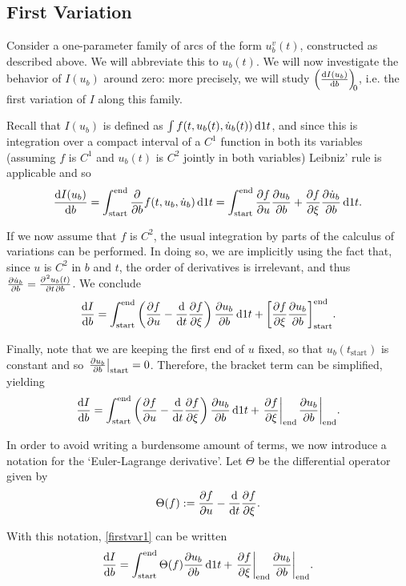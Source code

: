 \documentclass{article}
\theoremstyle{plain}
\theoremstyle{plain}
\theoremstyle{nonumberplain}
\theoremstyle{empty}
\newcommand{\tstart}{\mathrm{start}}
\newcommand{\tend}{\mathrm{end}}
\DeclarePairedDelimiter\eval{.}{\rvert}
\DeclarePairedDelimiter\bracket{[}{]}
\begin{document}
\subsection{First Variation}\label{sec:firstvar}

Consider a one-parameter family of arcs of the form $u_b^v(t)$, constructed as described above. We will abbreviate this to $u_b(t)$. We will now investigate the behavior of $I(u_b)$ around zero: more precisely, we will study $\diff{I(u_b)}b[0]$, i.e. the first variation of $I$ along this family.

Recall that $I(u_b)$ is defined as $\int f(t, u_b(t), \dot u_b(t)) \dl1 t$, and since this is integration over a compact interval of a $C^1$ function in both its variables (assuming $f$ is $C^1$ and $u_b(t)$ is $C^2$ jointly in both variables) Leibniz' rule is applicable and so
\[\diff{I(u_b)}b = \int_\tstart^\tend \diffp*{f(t, u_b, \dot u_b)}b \dl1 t =\int_\tstart^\tend \diffp f u \diffp{u_b}b + \diffp f \xi \diffp{\dot u_b}b \dl1 t.\]

If we now assume that $f$ is $C^2$, the usual integration by parts of the calculus of variations can be performed. In doing so, we are implicitly using the fact that, since $u$ is $C^2$ in $b$ and $t$, the order of derivatives is irrelevant, and thus $\diffp{\dot u_b}b = \diffp{u_b(t)}{t,b}$. We conclude
\[\diff I b = \int_\tstart^\tend \left( \diffp f u - \diff*{\diffp f \xi}t \right) \diffp{u_b}b \dl1 t + \bracket*{ \diffp f \xi \diffp{u_b}b }_\tstart^\tend.\]

Finally, note that we are keeping the first end of $u$ fixed, so that $u_b(t_\tstart)$ is constant and so $\eval*{\diffp{u_b}b}_\tstart = 0$. Therefore, the bracket term can be simplified, yielding
\begin{equation}\label{firstvar1}
\diff I b = \int_\tstart^\tend \left( \diffp f u - \diff*{\diffp f \xi}t \right) \diffp{u_b}b \dl1 t + \eval*{\diffp f \xi}_\tend \eval*{\diffp{u_b}b}_\tend.
\end{equation}

In order to avoid writing a burdensome amount of terms, we now introduce a notation for the `Euler-Lagrange derivative'. Let $\Theta$ be the differential operator given by
\[\Theta(f) := \diffp f u - \diff*{\diffp f \xi}t.\]

With this notation, \eqref{firstvar1} can be written
\begin{equation}\label{firstvar2}
\diff I b = \int_\tstart^\tend \Theta(f) \diffp{u_b}b \dl1 t + \eval*{\diffp f \xi}_\tend \eval*{\diffp{u_b}b}_\tend.
\end{equation}
\end{document}
